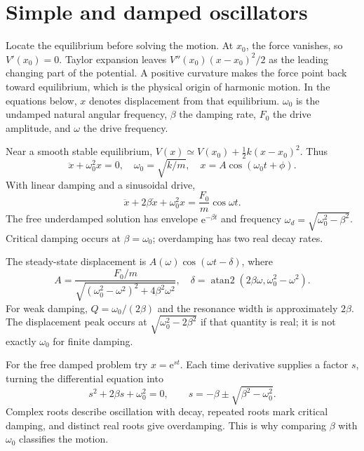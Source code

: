 \documentclass[11pt,oneside]{book}
\newcommand{\ee}{\mathrm{e}}
\theoremstyle{reviewstyle}
\begin{document}
\section{Simple and damped oscillators}
Locate the equilibrium before solving the motion. At $x_0$, the force vanishes, so $V'(x_0)=0$. Taylor expansion leaves $V''(x_0)(x-x_0)^2/2$ as the leading changing part of the potential. A positive curvature makes the force point back toward equilibrium, which is the physical origin of harmonic motion. In the equations below, $x$ denotes displacement from that equilibrium. $\omega_0$ is the undamped natural angular frequency, $\beta$ the damping rate, $F_0$ the drive amplitude, and $\omega$ the drive frequency.

Near a smooth stable equilibrium, $V(x)\simeq V(x_0)+\tfrac12k(x-x_0)^2$. Thus
\begin{equation}
\ddot x+\omega_0^2x=0,\quad \omega_0=\sqrt{k/m},\quad
x=A\cos(\omega_0t+\phi).
\end{equation}
With linear damping and a sinusoidal drive,
\begin{equation}
\ddot x+2\beta\dot x+\omega_0^2x=\frac{F_0}{m}\cos\omega t.
\end{equation}
The free underdamped solution has envelope $\ee^{-\beta t}$ and frequency $\omega_d=\sqrt{\omega_0^2-\beta^2}$. Critical damping occurs at $\beta=\omega_0$; overdamping has two real decay rates.

The steady-state displacement is $A(\omega)\cos(\omega t-\delta)$, where
\begin{equation}
A=\frac{F_0/m}{\sqrt{(\omega_0^2-\omega^2)^2+4\beta^2\omega^2}},\quad
\delta=\operatorname{atan2}(2\beta\omega,\omega_0^2-\omega^2).
\end{equation}
For weak damping, $Q=\omega_0/(2\beta)$ and the resonance width is approximately $2\beta$. The displacement peak occurs at $\sqrt{\omega_0^2-2\beta^2}$ if that quantity is real; it is not exactly $\omega_0$ for finite damping.

For the free damped problem try $x=\ee^{st}$. Each time derivative supplies a factor $s$, turning the differential equation into
\begin{equation}
s^2+2\beta s+\omega_0^2=0,
\qquad s=-\beta\pm\sqrt{\beta^2-\omega_0^2}.
\end{equation}
Complex roots describe oscillation with decay, repeated roots mark critical damping, and distinct real roots give overdamping. This is why comparing $\beta$ with $\omega_0$ classifies the motion.
\end{document}
